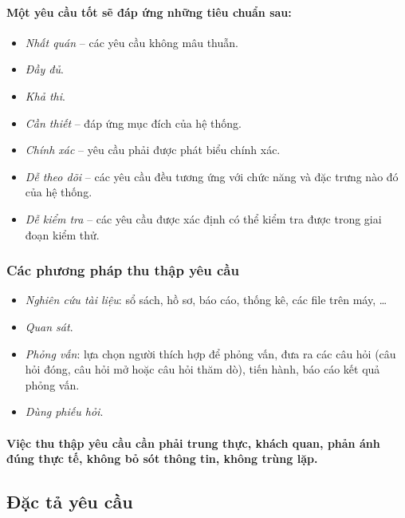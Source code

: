 \documentclass{article}
\begin{document}
    \paragraph{\textnormal{
      Một yêu cầu tốt sẽ đáp ứng những tiêu chuẩn sau:
    }}
    \begin{itemize}
      \item \textit{Nhất quán} -- các yêu cầu không mâu thuẫn.
      \item \textit{Đầy đủ}.
      \item \textit{Khả thi}.
      \item \textit{Cần thiết} -- đáp ứng mục đích của hệ thống.
      \item \textit{Chính xác} -- yêu cầu phải được phát biểu chính xác.
      \item \textit{Dễ theo dõi} -- các yêu cầu đều tương ứng với chức năng và đặc trưng nào đó của hệ thống.
      \item \textit{Dễ kiểm tra} -- các yêu cầu được xác định có thể kiểm tra được trong giai đoạn kiểm thử.
    \end{itemize}
  
  \subsubsection{Các phương pháp thu thập yêu cầu}
    \begin{itemize}
      \item \textit{Nghiên cứu tài liệu}: sổ sách, hồ sơ, báo cáo, thống kê, các file trên máy, \ldots
      \item \textit{Quan sát}.
      \item \textit{Phỏng vấn}: lựa chọn người thích hợp để phỏng vấn, đưa ra các câu hỏi (câu hỏi đóng, câu hỏi mở hoặc câu hỏi thăm dò), tiến hành, báo cáo kết quả phỏng vấn.
      \item \textit{Dùng phiếu hỏi}.
    \end{itemize}

    \paragraph{\textnormal{
      Việc thu thập yêu cầu cần phải trung thực, khách quan, phản ánh đúng thực tế, không bỏ sót thông tin, không trùng lặp.
    }}

  \subsection{Đặc tả yêu cầu}
\end{document}
